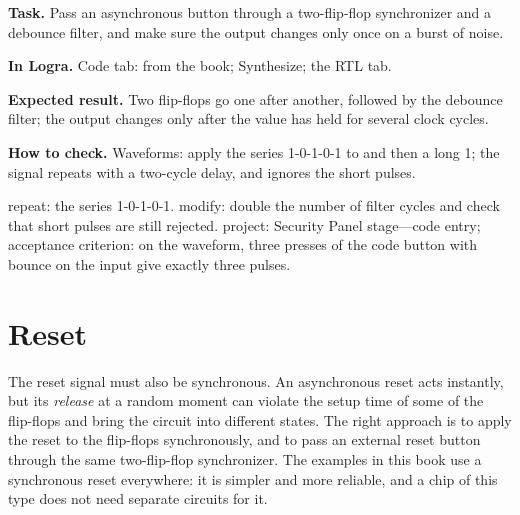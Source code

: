 \begin{diybox}
\textbf{Task.} Pass an asynchronous button through a two-flip-flop synchronizer and a debounce filter, and make sure the output changes only once on a burst of noise.

\textbf{In Logra.} Code tab:  from the book; Synthesize; the RTL tab.

\textbf{Expected result.} Two flip-flops go one after another, followed by the debounce filter; the output  changes only after the value has held for several clock cycles.

\textbf{How to check.} Waveforms: apply the series 1-0-1-0-1 to  and then a long 1; the signal  repeats  with a two-cycle delay, and  ignores the short pulses.

 repeat: the series 1-0-1-0-1.  modify: double the number of filter cycles and check that short pulses are still rejected.  project: Security Panel stage---code entry; acceptance criterion: on the waveform, three presses of the code button with bounce on the input give exactly three  pulses.
\end{diybox}

\section{Reset}

The reset signal must also be synchronous. An asynchronous reset acts
instantly, but its \emph{release} at a random moment can violate the setup time
of some of the flip-flops and bring the circuit into different states. The
right approach is to apply the reset to the flip-flops synchronously, and to
pass an external reset button through the same two-flip-flop synchronizer. The
examples in this book use a synchronous reset everywhere: it is simpler and
more reliable, and a chip of this type does not need separate circuits for it.

